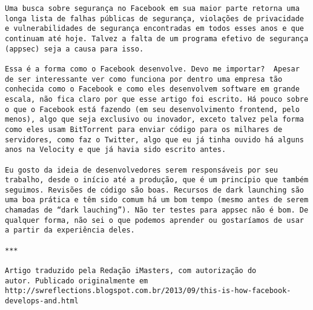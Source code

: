 \begin{verbatim}
Uma busca sobre segurança no Facebook em sua maior parte retorna uma
longa lista de falhas públicas de segurança, violações de privacidade
e vulnerabilidades de segurança encontradas em todos esses anos e que
continuam até hoje. Talvez a falta de um programa efetivo de segurança
(appsec) seja a causa para isso.

Essa é a forma como o Facebook desenvolve. Devo me importar?  Apesar
de ser interessante ver como funciona por dentro uma empresa tão
conhecida como o Facebook e como eles desenvolvem software em grande
escala, não fica claro por que esse artigo foi escrito. Há pouco sobre
o que o Facebook está fazendo (em seu desenvolvimento frontend, pelo
menos), algo que seja exclusivo ou inovador, exceto talvez pela forma
como eles usam BitTorrent para enviar código para os milhares de
servidores, como faz o Twitter, algo que eu já tinha ouvido há alguns
anos na Velocity e que já havia sido escrito antes.

Eu gosto da ideia de desenvolvedores serem responsáveis por seu
trabalho, desde o início até a produção, que é um princípio que também
seguimos. Revisões de código são boas. Recursos de dark launching são
uma boa prática e têm sido comum há um bom tempo (mesmo antes de serem
chamadas de “dark lauching”). Não ter testes para appsec não é bom. De
qualquer forma, não sei o que podemos aprender ou gostaríamos de usar
a partir da experiência deles.

***

Artigo traduzido pela Redação iMasters, com autorização do
autor. Publicado originalmente em
http://swreflections.blogspot.com.br/2013/09/this-is-how-facebook-develops-and.html
\end{verbatim}


\newpage

